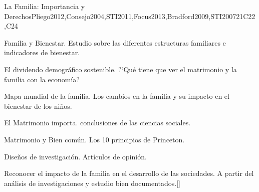 \begin{syllabus}
\begin{unit}{}{La Familia: Importancia y Derechos}{Pliego2012,Consejo2004,STI2011,Focus2013,Bradford2009,STI2007}{21}{C22,C24}
\begin{topics}
	\item Familia y Bienestar. 
		\subitem Estudio sobre las diferentes estructuras familiares e indicadores de bienestar.
	\item El dividendo demográfico sostenible.
		\subitem ?`Qué tiene que ver el matrimonio y la familia con la economía? 
	\item Mapa mundial de la familia. 
		\subitem Los cambios en la familia y su impacto en el bienestar de los niños.
	\item El Matrimonio importa. 
		 conclusiones de las ciencias sociales.
	\item Matrimonio y Bien común. 
		\subitem Los 10 principios de Princeton.
	\item Diseños de investigación.
		\subitem Artículos de opinión.
\end{topics}

\begin{learningoutcomes}
	\item Reconocer el impacto de la familia en el desarrollo de las sociedades. A partir del análisis de investigaciones y estudio bien documentados.[\Familiarity]
\end{learningoutcomes}
\end{unit}


\begin{coursebibliography}
\end{coursebibliography}

\end{syllabus}
